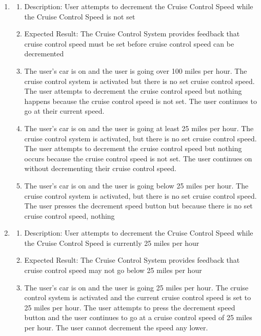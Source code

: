 \documentclass[preprint,11pt,3p]{article}
\begin{document}
\begin{enumerate}
	\item 
		\begin{enumerate}
	\item Description: User attempts to decrement the Cruise Control Speed while the Cruise Control Speed is not set
	\item Expected Result: The Cruise Control System provides feedback that cruise control speed must be set before cruise control speed can be decremented
	\item The user’s car is on and the user is going over 100 miles per hour. The cruise control system is activated but there is no set cruise control speed. The user attempts to decrement the cruise control speed but nothing happens because the cruise control speed is not set. The user continues to go at their current speed. 
	\item The user’s car is on and the user is going at least 25 miles per hour. The cruise control system is activated, but there is no set cruise control speed. The user attempts to decrement the cruise control speed but nothing occurs because the cruise control speed is not set. The user continues on without decrementing their cruise control speed. 
	\item The user’s car is on and the user is going below 25 miles per hour. The cruise control system is activated, but there is no set cruise control speed. The user presses the decrement speed button but because there is no set cruise control speed, nothing
\end{enumerate}

	\item 
		\begin{enumerate}
	\item Description: User attempts to decrement the Cruise Control Speed while the Cruise Control Speed is currently 25 miles per hour
	\item Expected Result: The Cruise Control System provides feedback that cruise control speed may not go below 25 miles per hour
	\item The user’s car is on and the user is going 25 miles per hour. The cruise control system is activated and the current cruise control speed is set to 25 miles per hour. The user attempts to press the decrement speed button and the user continues to go at a cruise control speed of 25 miles per hour. The user cannot decrement the speed any lower. 
\end{enumerate}


\end{enumerate}
\end{document}
